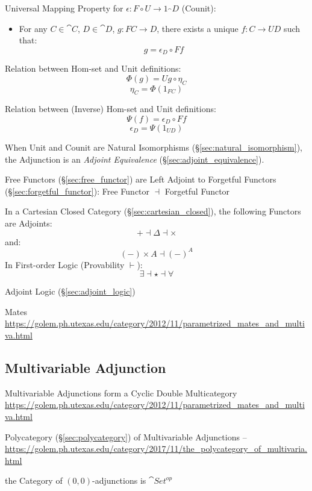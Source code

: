 Universal Mapping Property for $\epsilon : F \circ U \rightarrow
1_\cat{D}$ (Counit):
\begin{itemize}
\item For any $C \in \cat{C}$, $D \in \cat{D}$, $g : F C
  \rightarrow D$, there exists a unique $f : C \rightarrow U D$ such
  that:
  \[
    g = \epsilon_D \circ F f
  \]
\end{itemize}

Relation between Hom-set and Unit definitions:
\[
  \Phi(g) = U g \circ \eta_C
\]\[
  \eta_C = \Phi(1_{FC})
\]

Relation between (Inverse) Hom-set and Unit definitions:
\[
  \Psi (f) = \epsilon_D \circ F f
\]\[
  \epsilon_D = \Psi(1_{U D})
\]

When Unit and Counit are Natural Isomorphisms
(\S\ref{sec:natural_isomorphism}), the Adjunction is an \emph{Adjoint
  Equivalence} (\S\ref{sec:adjoint_equivalence}).

Free Functors (\S\ref{sec:free_functor}) are Left Adjoint to Forgetful
Functors (\S\ref{sec:forgetful_functor}): Free Functor $\dashv$
Forgetful Functor

In a Cartesian Closed Category (\S\ref{sec:cartesian_closed}), the
following Functors are Adjoints:
\[
  + \dashv \Delta \dashv \times
\]
and:
\[
  (-) \times A \dashv (-)^A
\]
In First-order Logic (Provability $\vdash$):
\[
  \exists \dashv \star \dashv \forall
\]

Adjoint Logic (\S\ref{sec:adjoint_logic})

Mates
\url{https://golem.ph.utexas.edu/category/2012/11/parametrized_mates_and_multiva.html}



\subsection{Multivariable Adjunction}\label{sec:multivariable_adjunction}

Multivariable Adjunctions form a Cyclic Double Multicategory
\url{https://golem.ph.utexas.edu/category/2012/11/parametrized_mates_and_multiva.html}

Polycategory (\S\ref{sec:polycategory}) of Multivariable Adjunctions --
\url{https://golem.ph.utexas.edu/category/2017/11/the_polycategory_of_multivaria.html}

the Category of $(0,0)$-adjunctions is $\cat{Set}^{op}$



